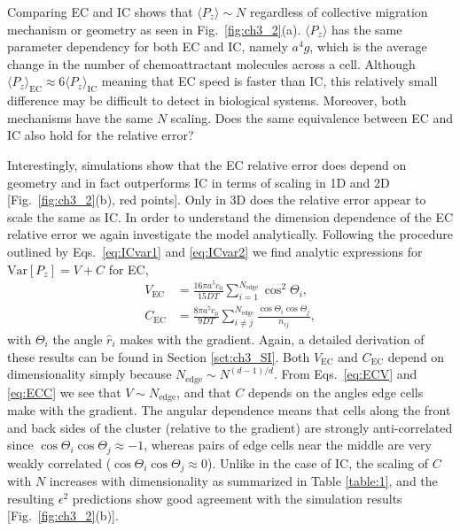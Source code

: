 Comparing EC and IC shows that $\langle P_z \rangle \sim N$ regardless of collective migration mechanism or geometry as seen in Fig.\ \ref{fig:ch3_2}(a). $\langle P_z \rangle$ has the same parameter dependency for both EC and IC, namely $a^4g$, which is the average change in the number of chemoattractant molecules across a cell. Although
$\langle P_z \rangle_\text{EC} \approx 6 \langle P_z \rangle_\text{IC}$
meaning that EC speed is faster than IC, this relatively small difference may be difficult to detect in biological systems. Moreover, both mechanisms have the same $N$ scaling.
Does the same equivalence between EC and IC also hold for the relative error?

Interestingly, simulations show that the EC relative error does depend on geometry and in fact outperforms IC in terms of scaling in 1D and 2D [Fig.\ \ref{fig:ch3_2}(b), red points]. Only in 3D does the relative error appear to scale the same as IC. In order to understand the dimension dependence of the EC relative error we again investigate the model analytically.
Following the procedure outlined by Eqs.\ \ref{eq:ICvar1} and \ref{eq:ICvar2} we find analytic expressions for $\text{Var}[P_z] = V + C$ for EC,
\begin{align}
    V_\text{EC} &= \frac{16\pi a^5c_0}{15DT} \sum_{i=1}^{N_\text{edge}} \cos^2\Theta_i \label{eq:ECV} , \\
    C_\text{EC} &= \frac{8\pi a^5c_0}{9DT} \sum_{i \neq j}^{N_\text{edge}} \frac{\cos\Theta_i\cos\Theta_j}{n_{ij}} , \label{eq:ECC}
\end{align}
with $\Theta_i$ the angle $\hat{r}_i$ makes with the gradient. Again, a detailed derivation of these results can be found in Section \ref{sct:ch3_SI}. Both $V_\text{EC}$ and $C_\text{EC}$ depend on dimensionality simply because $N_\text{edge} \sim N^{(d-1)/d}$. From Eqs.\ \ref{eq:ECV} and \ref{eq:ECC} we see that
$V \sim N_\text{edge}$,
and that $C$ depends on the angles edge cells make with the gradient. The angular dependence means that cells along the front and back sides of the cluster (relative to the gradient) are strongly anti-correlated since $\cos\Theta_i\cos\Theta_j \approx -1$,
whereas pairs of edge cells near the middle are very weakly correlated ($\cos\Theta_i\cos\Theta_j \approx 0$). Unlike in the case of IC, the scaling of $C$ with $N$ increases with dimensionality as summarized in Table \ref{table:1}, and the resulting $\epsilon^2$ predictions show good agreement with the simulation results [Fig.\ \ref{fig:ch3_2}(b)].

